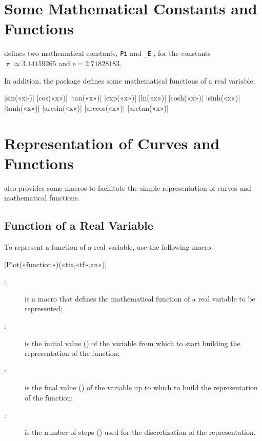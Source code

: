 \documentclass[a4paper,english]{article}
\begin{document}
  \section{Some Mathematical Constants and Functions}

  \mpgeomdd defines two mathematical constants, \lstinline+Pi+ and \lstinline+_E+
  , for the constants
  $\uppi\simeq 3.14159265$ and $\mathrm{e}=2.71828183$.

  In addition, the package defines some mathematical functions of a real variable:
\begin{colourband}
\macro|sin(«x»)| 
\macro|cos(«x»)| 
\macro|tan(«x»)| 
\macro|exp(«x»)| 
\macro|ln(«x»)|  
\macro|cosh(«x»)| 
\macro|sinh(«x»)| 
\macro|tanh(«x»)| 
\macro|arcsin(«x»)| 
\macro|arccos(«x»)| 
\macro|arctan(«x»)|  
\end{colourband}
\section{Representation of Curves and Functions}

\mpgeomdd{} also provides some macros to facilitate the simple representation of curves and mathematical functions.

\subsection{Function of a Real Variable}

To represent a function of a real variable, use the following macro:
\begin{colourband}
  \macro|Plot(«function»)(«ti»,«tf»,«n»)|
  \begin{description}
    \item[:] is a \MP{} macro that defines the mathematical function of a real variable to be represented;
    \item[:] is the initial value () of the variable from which to start building the representation of the function;
    \item[:] is the final value () of the variable up to which to build the representation of the function;
    \item[:] is the number of steps () used for the discretization of the representation.
  \end{description}
\end{colourband}
\end{document}
